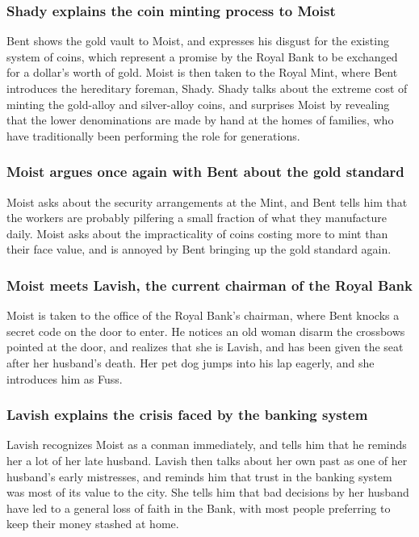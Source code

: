 \subsubsection{\Gls{Shady} explains the coin minting process to \Gls{Moist}}
\Gls{Bent} shows the gold vault to \Gls{Moist}, and expresses his disgust for the existing system
of coins, which represent a promise by the Royal Bank to be exchanged for a dollar's worth of gold.
\Gls{Moist} is then taken to the Royal Mint, where \Gls{Bent} introduces the hereditary foreman,
\Gls{Shady}. \Gls{Shady} talks about the extreme cost of minting the gold-alloy and silver-alloy
coins, and surprises \Gls{Moist} by revealing that the lower denominations are made by hand at the
homes of families, who have traditionally been performing the role for generations.

\subsubsection{\Gls{Moist} argues once again with \Gls{Bent} about the gold standard}
\Gls{Moist} asks about the security arrangements at the Mint, and \Gls{Bent} tells him that the
workers are probably pilfering a small fraction of what they manufacture daily. \Gls{Moist} asks
about the impracticality of coins costing more to mint than their face value, and is annoyed by
\Gls{Bent} bringing up the gold standard again.

\subsubsection{\Gls{Moist} meets \Gls{Lavish}, the current chairman of the Royal Bank}
\Gls{Moist} is taken to the office of the Royal Bank's chairman, where \Gls{Bent} knocks a secret
code on the door to enter. He notices an old woman disarm the crossbows pointed at the door, and
realizes that she is \Gls{Lavish}, and has been given the seat after her husband's death. Her pet
dog jumps into his lap eagerly, and she introduces him as \Gls{Fuss}.

\subsubsection{\Gls{Lavish} explains the crisis faced by the banking system}
\Gls{Lavish} recognizes \Gls{Moist} as a conman immediately, and tells him that he reminds her a lot
of her late husband. \Gls{Lavish} then talks about her own past as one of her husband's early
mistresses, and reminds him that trust in the banking system was most of its value to the city.
She tells him that bad decisions by her husband have led to a general loss of faith in the Bank,
with most people preferring to keep their money stashed at home.

